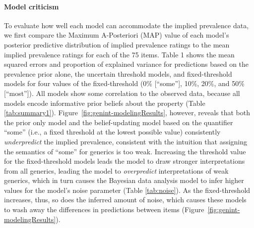 \documentclass[floatsintext,doc]{apa6}
\let\oldparagraph\paragraph
\renewcommand{\paragraph}[1]{\oldparagraph{#1}\mbox{}}
\begin{document}
\hypertarget{model-criticism}{%
\paragraph{Model criticism}\label{model-criticism}}
%
To evaluate how well each model can accommodate the implied prevalence data, we first compare the Maximum A-Posteriori  (MAP) value of each model's posterior predictive distribution of implied prevalence ratings to the mean implied prevalence ratings for each of the 75 items.
Table 1 shows the mean squared errors and proportion of explained variance for predictions based on the prevalence prior alone, the uncertain threshold models, and fixed-threshold models for four values of the fixed-threshold (0\% [``some''], 10\%, 20\%, and 50\% [``most'']).
All models show some correlation to the observed data, because all models encode informative prior beliefs about the property (Table \ref{tab:summary1}). 
Figure~\ref{fig:genint-modelingResults}, however, reveals that both the prior only model and the belief-updating model based on the quantifier \enquote{some} (i.e., a fixed threshold at the lowest possible value) consistently \emph{underpredict} the implied prevalence, consistent with the intuition that assigning the semantics of \enquote{some} for generics is too weak.
Increasing the threshold value for the fixed-threshold models leads the model to draw stronger interpretations from all generics, leading the model to \emph{overpredict} interpretations of weak generics,  which in turn causes the Bayesian data analysis model to infer higher values for the model's noise parameter (Table \ref{tab:noise}).
As the fixed-threshold increases, thus, so does the inferred amount of noise, which causes these models to wash away the differences in predictions between items (Figure~\ref{fig:genint-modelingResults}).
\end{document}
